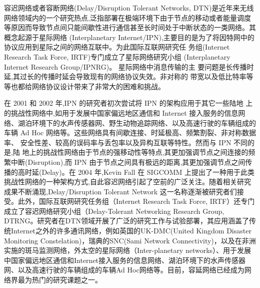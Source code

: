 \begin{introduction}

容迟网络或者容断网络(Delay/Disruption Tolerant Networks, DTN)是近年来无线网络领域内的一个研究热点,泛指部署在极端环境下由于节点的移动或者能量调度等原因而导致节点间只能间歇性进行通信甚至长时间处于中断状态的一类网络。其概念起源于星际网络 (Interplanetary Internet/IPN),主要目的是为了将因特网中的协议应用到星际之间的网络互联中。为此国际互联网研究任 务组(Internet Research Task Force, IRTF)专门成立了星际网络研究小组 (Interplanetary Internet Research Group/IPNRG)。 星际网络中消息传输的主 要问题是长传播时延,其过长的传播时延会导致现有的网络协议失效。非对称的 带宽以及低比特率等等也都给网络协议设计带来了非常大的困难和挑战。

    在 2001 和 2002 年,IPN 的研究者初次尝试将 IPN 的架构应用于其它一些陆地 上的挑战性网络中,如用于发展中国家偏远地区通信和 Internet 接入服务的信息网 络、湖泊环境下的水声传感器网、野生动物追踪网络、以及高速行驶的车辆组成的 车辆 Ad Hoc 网络等。这些网络具有间歇连接、时延极高、频繁割裂、非对称数据率、 安全性差、较高的误码率与丢包率以及异构互联等特性。然而与 IPN 不同的是,陆 地上的挑战性网络由于节点的强移动性等特点,其更加强调节点之间连接的频繁中断(Disruption),而 IPN 由于节点之间具有极远的距离,其更加强调节点之间传播的高时延(Delay)。在 2004 年,Kevin Fall 在 SIGCOMM 上提出了一种用于此类挑战性网络的一种架构方式,自此容迟网络引起了空前的广泛关注。随着相关研究成果不断涌现,Delay/Disruption Tolerant Network 这一名称逐渐被研究者们接受。此外，国际互联网研究任务组（Internet Research Task Force, IRTF）还专门成立了容迟网络研究小组（Delay-Tolerant Networking Research Group, DTRNG。研究者在DTN领域开展了广泛的研究工作与试验部署，其应用涵盖了传统Internet之外的许多通讯网络，例如英国的UK-DMC(United Kingdom Disaster Monitoring Constelation)，瑞典的SNC(Sami Network Connectivity)，以及在非洲实施的斑马监测网络，外太空的星际网络（Inter-planetary networks）、用于发展中国家偏远地区通信和Internet接入服务的信息网络、湖泊环境下的水声传感器网、以及高速行驶的车辆组成的车辆Ad Hoc网络等。目前，容延网络已经成为网络界最为热门的研究课题之一。


\end{introduction}
